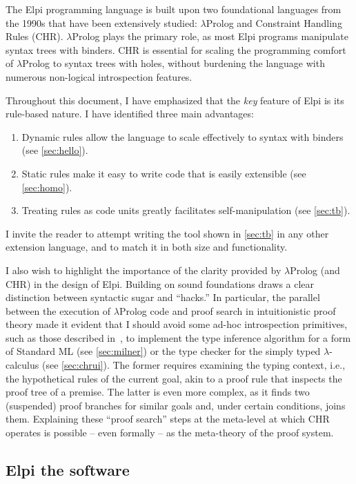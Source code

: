 \documentclass{these-ISSS}
\begin{document}
The Elpi programming language is built upon two foundational languages from the
1990s that have been extensively studied: $\lambda$Prolog and Constraint
Handling Rules (CHR). $\lambda$Prolog plays the primary role, as most Elpi
programs manipulate syntax trees with binders. CHR is essential for scaling the
programming comfort of $\lambda$Prolog to syntax trees with holes, without
burdening the language with numerous non-logical introspection features.

Throughout this document, I have emphasized that the \emph{key} feature of Elpi
is its rule-based nature. I have identified three main advantages:
\begin{enumerate}
\item Dynamic rules allow the language to scale effectively to syntax with binders (see \cref{sec:hello}).
\item Static rules make it easy to write code that is easily extensible (see \cref{sec:homo}).
\item Treating rules as code units greatly facilitates self-manipulation (see \cref{sec:tb}).
\end{enumerate}

I invite the reader to attempt writing the  tool shown in
\cref{sec:tb} in any other extension language, and to match it in both
size and functionality.

I also wish to highlight the importance of the clarity provided by
$\lambda$Prolog (and CHR) in the design of Elpi. Building on sound foundations
draws a clear distinction between syntactic sugar and ``hacks.'' In particular,
the parallel between the execution of $\lambda$Prolog code and proof search in
intuitionistic proof theory made it evident that I should avoid 
some ad-hoc introspection primitives, such as those described in~\cite[Section 8 and
later]{10.1145/3236788}, to implement the type inference algorithm for a form
of Standard ML (see \cref{sec:milner}) or the type checker for the
simply typed $\lambda$-calculus (see \cref{sec:chrui}). The former
requires examining the typing context, i.e., the hypothetical rules of the
current goal, akin to a proof rule that inspects the proof tree of a premise.
The latter is even more complex, as it finds two (suspended) proof branches for
similar goals and, under certain conditions, joins them. Explaining these
``proof search'' steps at the meta-level at which CHR operates is possible -- even
formally -- as the meta-theory of the proof system.


\subsection{Elpi the software}
\end{document}
